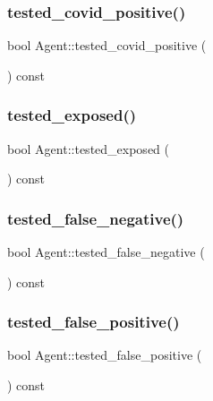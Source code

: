 \subsubsection{\texorpdfstring{tested\+\_\+covid\+\_\+positive()}{tested\_covid\_positive()}}
{\footnotesize\ttfamily bool Agent\+::tested\+\_\+covid\+\_\+positive (\begin{DoxyParamCaption}{ }\end{DoxyParamCaption}) const\hspace{0.3cm}{\ttfamily [inline]}}

\mbox{\label{classAgent_aaeda593b535a41928499198c60bff028}} 
\subsubsection{\texorpdfstring{tested\+\_\+exposed()}{tested\_exposed()}}
{\footnotesize\ttfamily bool Agent\+::tested\+\_\+exposed (\begin{DoxyParamCaption}{ }\end{DoxyParamCaption}) const\hspace{0.3cm}{\ttfamily [inline]}}

\mbox{\label{classAgent_a0cb482555c25432c955ddceb0e62b22a}} 
\subsubsection{\texorpdfstring{tested\+\_\+false\+\_\+negative()}{tested\_false\_negative()}}
{\footnotesize\ttfamily bool Agent\+::tested\+\_\+false\+\_\+negative (\begin{DoxyParamCaption}{ }\end{DoxyParamCaption}) const\hspace{0.3cm}{\ttfamily [inline]}}

\mbox{\label{classAgent_a89acf837bb933fa98d2809756d18725c}} 
\subsubsection{\texorpdfstring{tested\+\_\+false\+\_\+positive()}{tested\_false\_positive()}}
{\footnotesize\ttfamily bool Agent\+::tested\+\_\+false\+\_\+positive (\begin{DoxyParamCaption}{ }\end{DoxyParamCaption}) const\hspace{0.3cm}{\ttfamily [inline]}}

